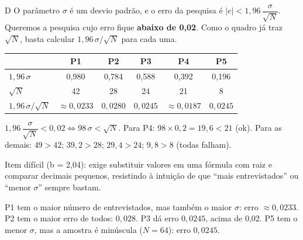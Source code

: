 \begin{resolucao}{D}
 O parâmetro $\sigma$ é um desvio padrão, e o erro da pesquisa é
$|e| < 1{,}96\,\dfrac{\sigma}{\sqrt{N}}$. Queremos a pesquisa cujo erro fique \textbf{abaixo de 0,02}.
Como o quadro já traz $\sqrt{N}$, basta calcular $1{,}96\,\sigma/\sqrt{N}$ para cada uma.

\begin{center}
\begin{tabular}{lccccc}
\toprule
 & P1 & P2 & P3 & P4 & P5 \\ \midrule
$1{,}96\,\sigma$ & 0,980 & 0,784 & 0,588 & 0,392 & 0,196 \\
$\sqrt{N}$ & 42 & 28 & 24 & 21 & 8 \\
$1{,}96\,\sigma/\sqrt{N}$ & $\approx 0{,}0233$ & $0{,}0280$ & $0{,}0245$ & $\approx 0{,}0187$ & $0{,}0245$ \\ \bottomrule
\end{tabular}
\end{center}

 $1{,}96\,\dfrac{\sigma}{\sqrt{N}} < 0{,}02 \iff 98\,\sigma < \sqrt{N}$.
Para P4: $98 \times 0{,}2 = 19{,}6 < 21$ (ok). Para as demais: $49 > 42$; $39{,}2 > 28$; $29{,}4 > 24$;
$9{,}8 > 8$ (todas falham).


Item difícil (b = 2,04): exige substituir valores em uma fórmula com raiz e comparar decimais pequenos,
resistindo à intuição de que “mais entrevistados” ou “menor $\sigma$” sempre bastam.

\begin{distratores}
 P1 tem o maior número de entrevistados, mas também o maior $\sigma$: erro $\approx 0{,}0233$.
 P2 tem o maior erro de todos: $0{,}028$.
 P3 dá erro $0{,}0245$, acima de 0,02.
 P5 tem o menor $\sigma$, mas a amostra é minúscula ($N = 64$): erro $0{,}0245$.
\end{distratores}
\end{resolucao}

